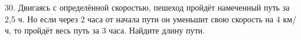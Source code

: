 30. Двигаясь с определённой скоростью, пешеход пройдёт намеченный путь за 2,5 ч. Но если через 2 часа от начала пути он уменьшит свою скорость на 4 км/ч, то пройдёт весь путь за 3 часа. Найдите длину пути.\\
